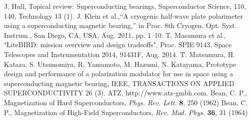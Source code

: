 \documentclass[iournal]{IEEEtran}
\begin{document}
%
%
%
\begin{thebibliography}{99}

J. Hull, Topical review: Superconducting bearings, Superconductor Science, 110, 140, Technology 13 (1).
J. Klein et al.,“A cryogenic half-wave plate polarimeter using a superconducting magnetic bearing,” in Proc. 8th Cryogen. Opt. Syst. Instrum., San Diego, CA, USA, Aug. 2011, pp. 1–10.
T. Masumura et al., "LiteBIRD: mission overview and design tradeoffs", Proc. SPIE 9143, Space Telescopes and Instrumentation 2014, 91431F, Aug. 2014.
T. Matsumura, H. Kataza, S. Utsunomiya, R. Yamamoto, M. Hazumi, N. Katayama, Prototype design and performance of a polarization modulator for use in space using a superconducting magnetic bearing, IEEE, TRANSACTIONS ON APPLIED SUPERCONDUCTIVITY 26 (3).
ATZ, http://www.atz-gmbh.com.
Bean, C. P., Magnetization of Hard Superconductors, {\em Phys. Rev. Lett.\/} {\bf 8}, 250 (1962)
Bean, C. P., Magnetization of High-Field Superconductors, {\em Rev. Mod. Phys.\/} {\bf 36}, 31 (1964)
\end{thebibliography}

%






\end{document}
